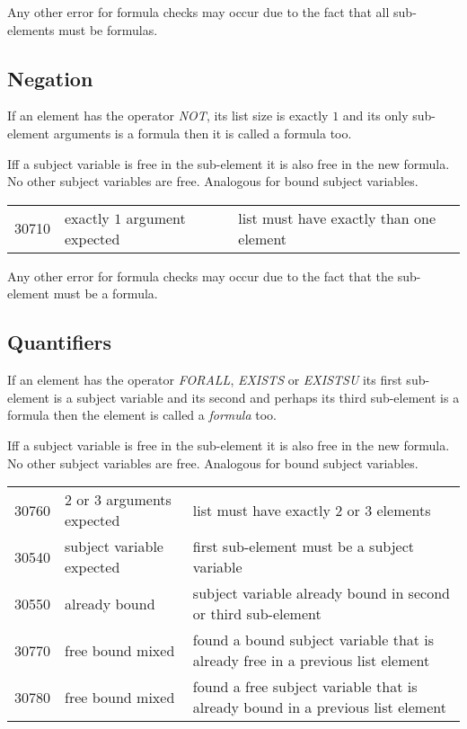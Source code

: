\documentclass[a4paper,german,10pt,twoside]{book}
\theoremstyle{definition}
\theoremstyle{remark}
\begin{document}
\par
Any other error for formula checks may occur due to the fact that all sub-elements must be formulas.


\subsection{Negation
}
If an element has the operator \emph{NOT}, its list size is exactly $1$ and its  only sub-element arguments is a formula then it is called a formula too.

\par
Iff a subject variable is free in the sub-element it is also free in the new formula. No other subject variables are free. Analogous for bound subject variables. 

\begin{tabularx}{\linewidth}{llX}
  30710  & exactly $1$ argument expected & list must have exactly than one element \\
\end{tabularx}

\par
Any other error for formula checks may occur due to the fact that the sub-element must be a formula.


\subsection{Quantifiers
}
If an element has the operator \emph{FORALL}, \emph{EXISTS} or \emph{EXISTSU} its first sub-element is a subject variable and its second and perhaps its third sub-element is a formula then the element is called a \emph{formula} too.

\par
Iff a subject variable is free in the sub-element it is also free in the new formula. No other subject variables are free. Analogous for bound subject variables. 

\begin{tabularx}{\linewidth}{llX}
  30760  & $2$ or $3$ arguments expected & list must have exactly $2$ or $3$ elements \\
  30540  & subject variable expected & first sub-element must be a subject variable \\
  30550  & already bound             & subject variable already bound in second or third sub-element \\
  30770  & free bound mixed          & found a bound subject variable that is already free in a previous list element \\
  30780  & free bound mixed          & found a free subject variable that is already bound in a previous list element 
\end{tabularx}
\end{document}
